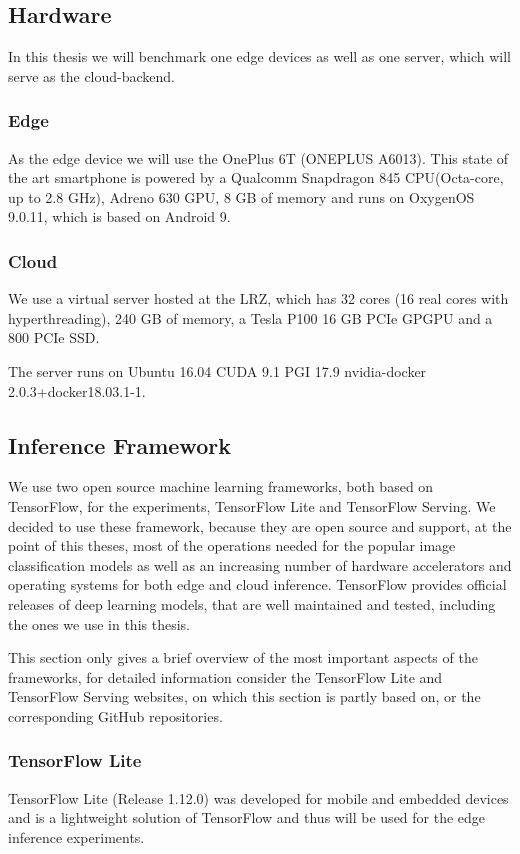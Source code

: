 \subsection{Hardware}
In this thesis we will benchmark one edge devices as well as one server, which will serve as the cloud-backend.
\subsubsection{Edge}
\label{chap:hardwareEdge}
As the edge device we will use the OnePlus 6T (ONEPLUS A6013). This state of the art smartphone is powered by a Qualcomm Snapdragon 845 CPU(Octa-core, up to 2.8 GHz), Adreno 630 GPU, 8 GB of memory and runs on OxygenOS 9.0.11, which is based on Android 9.
\subsubsection{Cloud}
We use a virtual server hosted at the LRZ, which has 32 cores (16 real cores with hyperthreading), 240 GB of memory, a Tesla P100 16 GB PCIe GPGPU and a 800 PCIe SSD.

The server runs on Ubuntu 16.04 CUDA 9.1 PGI 17.9 nvidia-docker 2.0.3+docker18.03.1-1.
\subsection{Inference Framework}
We use two open source machine learning frameworks, both based on TensorFlow, for the experiments, TensorFlow Lite and TensorFlow Serving. We decided to use these framework, because they are open source and support, at the point of this theses, most of the operations needed for the popular image classification models as well as an increasing number of hardware accelerators and operating systems for both edge and cloud inference.
TensorFlow provides official releases of deep learning models, that are well maintained and tested, including the ones we use in this thesis.

This section only gives a brief overview of the most important aspects of the frameworks, for detailed information consider the TensorFlow Lite\cite{tfLite}  and TensorFlow Serving\cite{tfServing} websites, on which this section is partly based on, or the corresponding GitHub repositories.
\subsubsection{TensorFlow Lite}
\label{chap:TFLite}
TensorFlow Lite (Release 1.12.0) was developed for mobile and embedded devices and is a lightweight solution of TensorFlow and thus will be used for the edge inference experiments.

